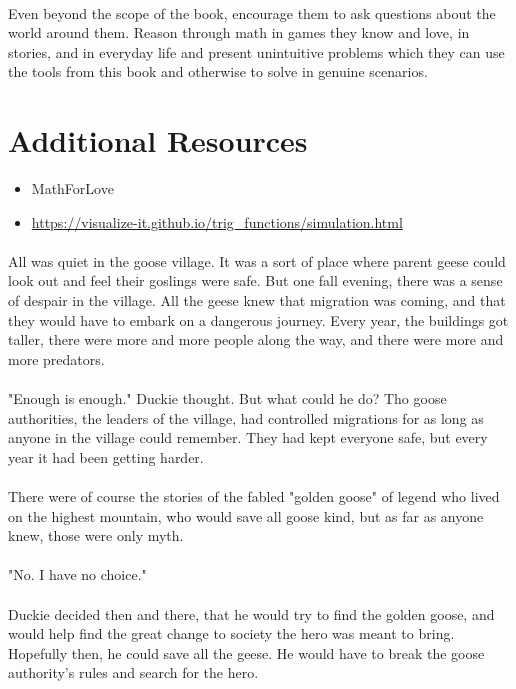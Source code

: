 \documentclass[a4paper,11pt ]{book}
\begin{document}
\paragraph{} Even beyond the scope of the book, encourage them to ask questions about the world around them. Reason through math in games they know and love, in stories, and in everyday life and present unintuitive problems which they can use the tools from this book and otherwise to solve in genuine scenarios. 
\section*{Additional Resources} 
\begin{itemize}
\item MathForLove
\item \url{https://visualize-it.github.io/trig_functions/simulation.html}
\end{itemize}
\tableofcontents
\vfill
\pagebreak
\paragraph{} All was quiet in the goose village. It was a sort of place where parent geese could look out and feel their goslings were safe. But one fall evening, there was a sense of despair in the village. All the geese knew that migration was coming, and that they would have to embark on a dangerous journey. Every year, the buildings got taller, there were more and more people along the way, and there were more and more predators. 
\paragraph{} "Enough is enough." Duckie thought. But what could he do? Tho goose authorities, the leaders of the village, had controlled migrations for as long as anyone in the village could remember. They had kept everyone safe, but every year it had been getting harder.
\paragraph{} There were of course the stories of the fabled "golden goose" of legend who lived on the highest mountain, who would save all goose kind, but as far as anyone knew, those were only myth.
\paragraph{} "No. I have no choice." 
\paragraph{} Duckie decided then and there, that he would try to find the golden goose, and would help find the great change to society the hero was meant to bring. Hopefully then, he could save all the geese. He would have to break the goose authority's rules and search for the hero.
\vfill
\pagebreak
\end{document}
